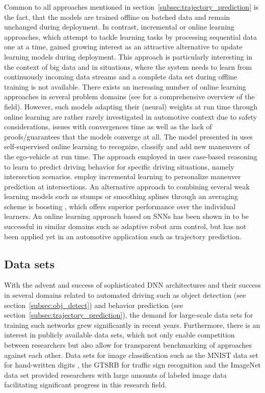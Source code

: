 Common to all approaches mentioned in section~\ref{subsec:trajectory_prediction} is the fact, that the models are trained offline on batched data and remain unchanged during deployment.
In contrast, incremental or online learning approaches, which attempt to tackle learning tasks by processing sequential data one at a time, gained growing interest as an attractive alternative to update learning models during deployment.
This approach is particularly interesting in the context of big data and in situations, where the system needs to learn from continuously incoming data streams and a complete data set during offline training is not available.
There exists an increasing number of online learning approaches in several problem domains (see \textcites{Losing2018}{Gomes2017}{Hoi2018} for a comprehensive overview of the field).
However, such models adapting their (neural) weights at run time through online learning are rather rarely investigated in automotive context due to safety considerations, issues with convergences time as well as the lack of proofs/guarantees that the models converge at all.
The model presented in \textcite{Maye2011} uses self-supervised online learning to recognize, classify and add new maneuvers of the ego-vehicle at run time.
The approach employed in \textcite{Graf2014} uses case-based reasoning to learn to predict driving behavior for specific driving situations, namely intersection scenarios.
\textcite{Losing2017} employ incremental learning to personalize maneuver prediction at intersections.
An alternative approach to combining several weak learning models such as stumps or smoothing splines through an averaging scheme is boosting \parencite{Taieb2014}, which offers superior performance over the individual learners.
An online learning approach based on \acp{SNN} has been shown in \textcite{DeWolf2016} to be successful in similar domains such as adaptive robot arm control, but has not been applied yet in an automotive application such as trajectory prediction.

\subsection{Data sets}%
\label{subsec:data_sets}

With the advent and success of sophisticated \ac{DNN} architectures and their success in several domains related to automated driving such as object detection (see section~\ref{subsec:obj_detect}) and behavior prediction (see section~\ref{subsec:trajectory_prediction}), the demand for large-scale data sets for training such networks grew significantly in recent years.
Furthermore, there is an interest in publicly available data sets, which not only enable competition between researchers but also allow for transparent benchmarking of approaches against each other.
Data sets for image classification such as the \ac{MNIST} data set for hand-written digits \parencite{LeCun1998}, the \ac{GTSRB} for traffic sign recognition \parencite{Stallkamp2012} and the ImageNet data set \parencite{Deng2009} provided researchers with large amounts of labeled image data facilitating significant progress in this research field.

